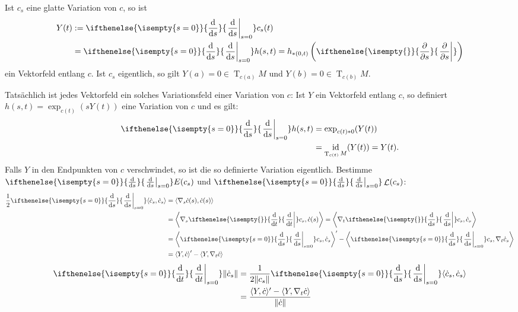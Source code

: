 \documentclass[paper=A4, twoside, chapterprefix=true, bibliography=totoc, headsepline]{scrbook}
\DeclareMathOperator{\calL}{\mathcal{L}}
\DeclareMathOperator{\id}{id}       %
\DeclareMathOperator{\T}{T}         %
\newcommand{\dop}{\mathrm{d}}
\newcommand{\difffrac}[3][]{\ifthenelse{\isempty{#1}}{\frac{\dop #2}{\dop #3}}{\left. \frac{\dop #2}{\dop #3} \right|_{#1}}}
\newcommand{\pdifffrac}[3][]{\ifthenelse{\isempty{#1}}{\frac{\partial #2}{\partial #3}}{\left. \frac{\partial #2}{\partial #3} \right|_{#1}}}
\theoremstyle{plain}
\theoremstyle{nonumberplain}
\theoremstyle{empty}
\theoremstyle{break}
\begin{document}
Ist $c_s$ eine glatte Variation von $c$, so ist
\begin{align*}
  Y(t) &:= \difffrac[s=0]{}{s} c_s(t)\\
  &= \difffrac[s=0]{}{s} h(s,t) =
  h_{*(0,t)}\left(\pdifffrac{}{s}\right)
\end{align*}
ein Vektorfeld entlang $c$. Ist $c_s$ eigentlich, so gilt $Y(a) = 0
\in \T_{c(a)}M$ und $Y(b) = 0 \in \T_{c(b)}M$.
\begin{center}\end{center}
Tats\"achlich ist jedes Vektorfeld ein solches Variationsfeld einer Variation von $c$: Ist $Y$ ein Vektorfeld entlang $c$, so definiert $h(s,t) = \exp_{c(t)}(s Y(t))$ eine Variation von $c$ und es gilt:
\begin{align*}
  \difffrac[s=0]{}{s} h(s,t) &= \exp_{c(t)*0}(Y(t))\\
  &= \id_{\T_{c(t)}M}(Y(t)) = Y(t).
\end{align*}
Falls $Y$ in den Endpunkten von $c$ verschwindet, so ist die so definierte Variation eigentlich.
Bestimme $\difffrac[s=0]{}{s} E(c_s)$ und $\difffrac[s=0]{}{s}\calL(c_s)$:
\begin{align*}
  \frac{1}{2} \difffrac[s=0]{}{s} \langle \dot c_s, \dot c_s \rangle &= \langle \nabla_s \dot c(s), \dot c(s) \rangle\\
  &= \left\langle \nabla_s \difffrac{}{t} c_s, \dot c(s) \right\rangle = \left\langle \nabla_t \difffrac{}{s} c_s, \dot c_s \right\rangle \\
  &= \left\langle \difffrac[s=0]{}{s} c_s, \dot c_s \right\rangle' - \left\langle \difffrac[s=0]{}{s} c_s, \nabla_t \dot c_s \right\rangle \\
  &= \left\langle Y, \dot c \right\rangle' - \left\langle Y, \nabla_t \dot c \right\rangle\\
\end{align*}
\begin{align*}
  \difffrac[s=0]{}{t} \|\dot c_s\| &= \frac{1}{2 \|c_s\|} \difffrac[s=0]{}{s} \langle \dot c_s, \dot c_s \rangle\\
  &= \frac{\langle Y, \dot c \rangle' - \langle Y, \nabla_t \dot c
    \rangle}{\|\dot c\|}
\end{align*}
\end{document}
